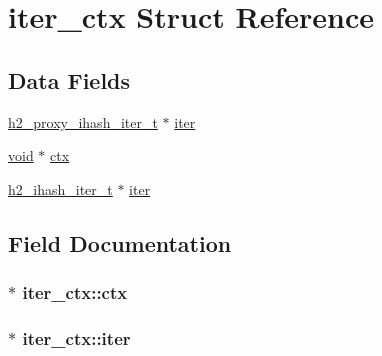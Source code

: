 \hypertarget{structiter__ctx}{}\section{iter\+\_\+ctx Struct Reference}
\label{structiter__ctx}
\subsection*{Data Fields}
\begin{DoxyCompactItemize}
\item 
\hyperlink{h2__proxy__util_8h_ac0ac7960118c2c933cd1f28c0879df35}{h2\+\_\+proxy\+\_\+ihash\+\_\+iter\+\_\+t} $\ast$ \hyperlink{structiter__ctx_a36b164d6f438a4b1c950147987cfbd46}{iter}
\item 
\hyperlink{group__MOD__ISAPI_gacd6cdbf73df3d9eed42fa493d9b621a6}{void} $\ast$ \hyperlink{structiter__ctx_a0379c58f073e4e95a2ef7643333c8789}{ctx}
\item 
\hyperlink{h2__util_8h_aaa9a464db9ecc64801930a3b1a04efd4}{h2\+\_\+ihash\+\_\+iter\+\_\+t} $\ast$ \hyperlink{structiter__ctx_a2c0db4f484a7318e5b5278f3c2f46ac7}{iter}
\end{DoxyCompactItemize}


\subsection{Field Documentation}
\subsubsection[{\texorpdfstring{ctx}{ctx}}]{ $\ast$ iter\+\_\+ctx\+::ctx}\hypertarget{structiter__ctx_a0379c58f073e4e95a2ef7643333c8789}{}\label{structiter__ctx_a0379c58f073e4e95a2ef7643333c8789}
\subsubsection[{\texorpdfstring{iter}{iter}}]{$\ast$ iter\+\_\+ctx\+::iter}\hypertarget{structiter__ctx_a36b164d6f438a4b1c950147987cfbd46}{}\label{structiter__ctx_a36b164d6f438a4b1c950147987cfbd46}
